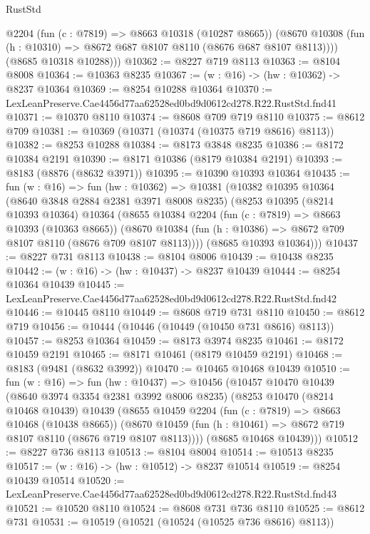 \begin{lexlean}{RustStd}
\begin{coremodule}
          @2204
          (fun (c : @7819) => @8663 @10318 (@10287 @8665))
          (@8670 @10308 (fun (h : @10310) => @8672 @687 @8107 @8110 (@8676 @687 @8107 @8113))))
        (@8685 @10318 @10288)))
@10362 := @8227 @719 @8113
@10363 := @8104 @8008
@10364 := @10363 @8235
@10367 := (w : @16) -> (hw : @10362) -> @8237 @10364
@10369 := @8254 @10288 @10364
@10370 := LexLeanPreserve.Cae4456d77aa62528ed0bd9d0612cd278.R22.RustStd.fnd41
@10371 := @10370 @8110
@10374 := @8608 @709 @719 @8110
@10375 := @8612 @709
@10381 := @10369 (@10371 (@10374 (@10375 @719 @8616) @8113))
@10382 := @8253 @10288
@10384 := @8173 @3848 @8235
@10386 := @8172 @10384 @2191
@10390 := @8171 @10386 (@8179 @10384 @2191)
@10393 := @8183 (@8876 (@8632 @3971))
@10395 := @10390 @10393 @10364
@10435 := fun (w : @16) =>
  fun (hw : @10362) =>
  @10381
    (@10382
      @10395
      @10364
      (@8640 @3848 @2884 @2381 @3971 @8008 @8235)
      (@8253
        @10395
        (@8214 @10393 @10364)
        @10364
        (@8655
          @10384
          @2204
          (fun (c : @7819) => @8663 @10393 (@10363 @8665))
          (@8670 @10384 (fun (h : @10386) => @8672 @709 @8107 @8110 (@8676 @709 @8107 @8113))))
        (@8685 @10393 @10364)))
@10437 := @8227 @731 @8113
@10438 := @8104 @8006
@10439 := @10438 @8235
@10442 := (w : @16) -> (hw : @10437) -> @8237 @10439
@10444 := @8254 @10364 @10439
@10445 := LexLeanPreserve.Cae4456d77aa62528ed0bd9d0612cd278.R22.RustStd.fnd42
@10446 := @10445 @8110
@10449 := @8608 @719 @731 @8110
@10450 := @8612 @719
@10456 := @10444 (@10446 (@10449 (@10450 @731 @8616) @8113))
@10457 := @8253 @10364
@10459 := @8173 @3974 @8235
@10461 := @8172 @10459 @2191
@10465 := @8171 @10461 (@8179 @10459 @2191)
@10468 := @8183 (@9481 (@8632 @3992))
@10470 := @10465 @10468 @10439
@10510 := fun (w : @16) =>
  fun (hw : @10437) =>
  @10456
    (@10457
      @10470
      @10439
      (@8640 @3974 @3354 @2381 @3992 @8006 @8235)
      (@8253
        @10470
        (@8214 @10468 @10439)
        @10439
        (@8655
          @10459
          @2204
          (fun (c : @7819) => @8663 @10468 (@10438 @8665))
          (@8670 @10459 (fun (h : @10461) => @8672 @719 @8107 @8110 (@8676 @719 @8107 @8113))))
        (@8685 @10468 @10439)))
@10512 := @8227 @736 @8113
@10513 := @8104 @8004
@10514 := @10513 @8235
@10517 := (w : @16) -> (hw : @10512) -> @8237 @10514
@10519 := @8254 @10439 @10514
@10520 := LexLeanPreserve.Cae4456d77aa62528ed0bd9d0612cd278.R22.RustStd.fnd43
@10521 := @10520 @8110
@10524 := @8608 @731 @736 @8110
@10525 := @8612 @731
@10531 := @10519 (@10521 (@10524 (@10525 @736 @8616) @8113))

\end{coremodule}
\end{lexlean}
